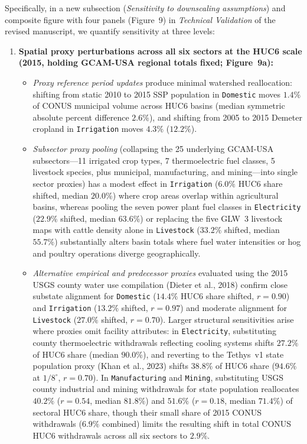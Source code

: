 \documentclass[11pt,letterpaper]{article}
\begin{document}
{Specifically, in a new subsection (\textit{Sensitivity to downscaling assumptions}) and composite figure with four panels (Figure~9) in \textit{Technical Validation} of the revised manuscript, we quantify sensitivity at three levels:
\begin{enumerate}[label=\arabic*), leftmargin=1.6em, topsep=2pt, itemsep=2pt]
  \item \textbf{Spatial proxy perturbations across all six sectors at the HUC6 scale (2015, holding GCAM-USA regional totals fixed; Figure~9a):}
  \begin{itemize}[leftmargin=1.4em, topsep=1pt, itemsep=1pt]
    \item \textit{Proxy reference period updates} produce minimal watershed reallocation: shifting from static 2010 to 2015 SSP population in \texttt{Domestic} moves $1.4\%$ of CONUS municipal volume across HUC6 basins (median symmetric absolute percent difference $2.6\%$), and shifting from 2005 to 2015 Demeter cropland in \texttt{Irrigation} moves $4.3\%$ ($12.2\%$).
    \item \textit{Subsector proxy pooling} (collapsing the 25 underlying GCAM-USA subsectors---11 irrigated crop types, 7 thermoelectric fuel classes, 5 livestock species, plus municipal, manufacturing, and mining---into single sector proxies) has a modest effect in \texttt{Irrigation} ($6.0\%$ HUC6 share shifted, median $20.0\%$) where crop areas overlap within agricultural basins, whereas pooling the seven power plant fuel classes in \texttt{Electricity} ($22.9\%$ shifted, median $63.6\%$) or replacing the five GLW~3 livestock maps with cattle density alone in \texttt{Livestock} ($33.2\%$ shifted, median $55.7\%$) substantially alters basin totals where fuel water intensities or hog and poultry operations diverge geographically.
    \item \textit{Alternative empirical and predecessor proxies} evaluated using the 2015 USGS county water use compilation (Dieter et al., 2018) confirm close substate alignment for \texttt{Domestic} ($14.4\%$ HUC6 share shifted, $r=0.90$) and \texttt{Irrigation} ($13.2\%$ shifted, $r=0.97$) and moderate alignment for \texttt{Livestock} ($27.0\%$ shifted, $r=0.70$). Larger structural sensitivities arise where proxies omit facility attributes: in \texttt{Electricity}, substituting county thermoelectric withdrawals reflecting cooling systems shifts $27.2\%$ of HUC6 share (median $90.0\%$), and reverting to the Tethys~v1 state population proxy (Khan et al., 2023) shifts $38.8\%$ of HUC6 share ($94.6\%$ at $1/8^{\circ}$, $r=0.70$). In \texttt{Manufacturing} and \texttt{Mining}, substituting USGS county industrial and mining withdrawals for state population reallocates $40.2\%$ ($r=0.54$, median $81.8\%$) and $51.6\%$ ($r=0.18$, median $71.4\%$) of sectoral HUC6 share, though their small share of 2015 CONUS withdrawals ($6.9\%$ combined) limits the resulting shift in total CONUS HUC6 withdrawals across all six sectors to $2.9\%$.

\end{itemize}
\end{enumerate}}
\end{document}
